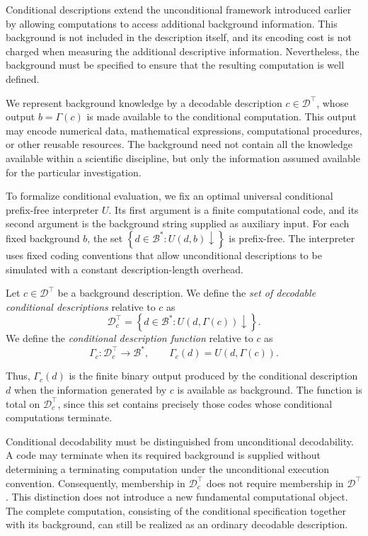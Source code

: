 Conditional descriptions extend the unconditional framework introduced earlier by allowing computations to access additional background information. This background is not included in the description itself, and its encoding cost is not charged when measuring the additional descriptive information. Nevertheless, the background must be specified to ensure that the resulting computation is well defined.

We represent background knowledge by a decodable description $c\in\mathcal{D}^\top$, whose output $b=\Gamma(c)$ is made available to the conditional computation. This output may encode numerical data, mathematical expressions, computational procedures, or other reusable resources. The background need not contain all the knowledge available within a scientific discipline, but only the information assumed available for the particular investigation.

To formalize conditional evaluation, we fix an optimal universal conditional prefix-free interpreter $U$. Its first argument is a finite computational code, and its second argument is the background string supplied as auxiliary input. For each fixed background $b$, the set $\left\{d\in\mathcal{B}^\ast:U(d,b)\downarrow\right\}$ is prefix-free. The interpreter uses fixed coding conventions that allow unconditional descriptions to be simulated with a constant description-length overhead.

\begin{definition}
\label{def:conditional_description_function}
Let $c\in\mathcal{D}^\top$ be a background description. We define the \emph{set of decodable conditional descriptions} relative to $c$ as
\[
\mathcal{D}_c^\top = \left\{d\in\mathcal{B}^\ast:U(d,\Gamma(c))\downarrow\right\}.
\]
We define the \emph{conditional description function}  relative to $c$ as
\[
\Gamma_c: \mathcal{D}_c^\top \longrightarrow \mathcal{B}^\ast, \qquad \Gamma_c(d)=U(d,\Gamma(c)).
\]
\end{definition}

Thus, $\Gamma_c(d)$ is the finite binary output produced by the conditional description $d$ when the information generated by $c$ is available as background. The function is total on $\mathcal{D}_c^\top$, since this set contains precisely those codes whose conditional computations terminate.

Conditional decodability must be distinguished from unconditional decodability. A code may terminate when its required background is supplied without determining a terminating computation under the unconditional execution convention. Consequently, membership in $\mathcal{D}_c^\top$ does not require membership in $\mathcal{D}^\top$. This distinction does not introduce a new fundamental computational object. The complete computation, consisting of the conditional specification together with its background, can still be realized as an ordinary decodable description.

